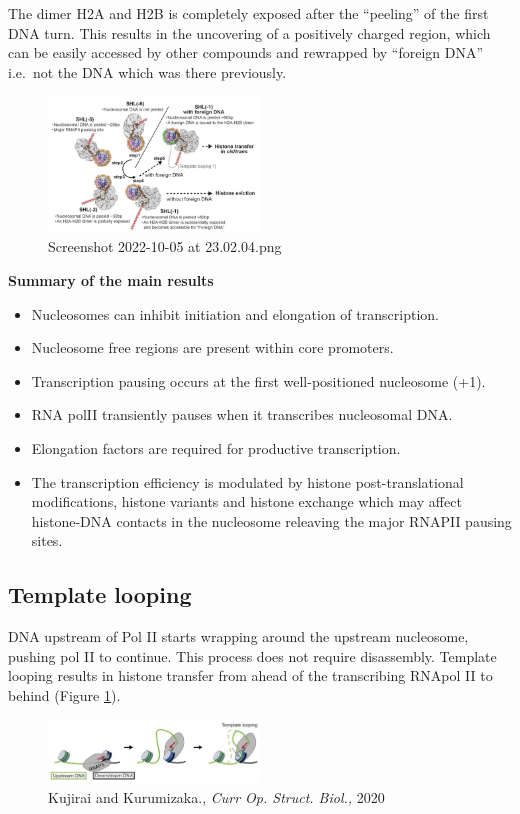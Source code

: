 The dimer H2A and H2B is completely exposed after the ``peeling'' of the first DNA turn. This results in the uncovering of a positively charged region, which can be easily accessed by other compounds and rewrapped by ``foreign DNA'' i.e.~not the DNA which was there previously.

\begin{figure}
\centering
\includegraphics[width=0.5\textwidth]{../_resources/Screenshot_2022-10-05_at_23-02-04.png}
\caption{Screenshot 2022-10-05 at 23.02.04.png}
\end{figure}

\textbf{Summary of the main results}

\begin{itemize}
\tightlist
\item
  Nucleosomes can inhibit initiation and elongation of transcription.
\item
  Nucleosome free regions are present within core promoters.
\item
  Transcription pausing occurs at the first well-positioned nucleosome (+1).
\item
  RNA polII transiently pauses when it transcribes nucleosomal DNA.
\item
  Elongation factors are required for productive transcription.
\item
  The transcription efficiency is modulated by histone post-translational modifications, histone variants and histone exchange which may affect histone-DNA contacts in the nucleosome releaving the major RNAPII pausing sites.
\end{itemize}

\hypertarget{template-looping}{%
\subsection{Template looping}\label{template-looping}}

DNA upstream of Pol II starts wrapping around the upstream nucleosome, pushing pol II to continue. This process does not require disassembly.
Template looping results in histone transfer from ahead of the transcribing RNApol II to behind (Figure \ref{fig:looping}). 
\begin{figure}
\centering
\includegraphics[width=0.5\textwidth]{../_resources/Screenshot_2022-10-05_at_23-04-42.png}
\caption{Kujirai and Kurumizaka., \emph{Curr Op. Struct. Biol.,} 2020}
\label{fig:looping}
\end{figure}

